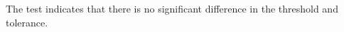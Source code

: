 The test indicates that there is no significant difference in the threshold and tolerance.

%
%
%
% 
